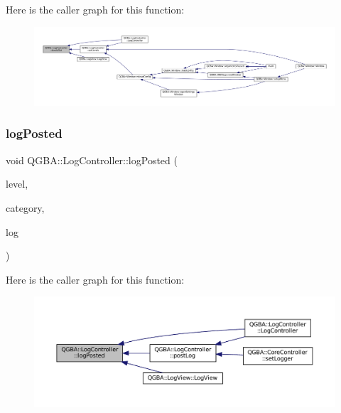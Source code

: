 Here is the caller graph for this function\+:
\nopagebreak
\begin{figure}[H]
\begin{center}
\leavevmode
\includegraphics[width=350pt]{class_q_g_b_a_1_1_log_controller_ac1dea8ca81dabf4fdf0d3910b09c9677_icgraph}
\end{center}
\end{figure}
\mbox{\label{class_q_g_b_a_1_1_log_controller_ae7c77f28b56b06f90761c3ecae19f2f0}} 
\subsubsection{\texorpdfstring{log\+Posted}{logPosted}}
{\footnotesize\ttfamily void Q\+G\+B\+A\+::\+Log\+Controller\+::log\+Posted (\begin{DoxyParamCaption}\item[{\mbox{\hyperlink{ioapi_8h_a787fa3cf048117ba7123753c1e74fcd6}{int}}}]{level,  }\item[{\mbox{\hyperlink{ioapi_8h_a787fa3cf048117ba7123753c1e74fcd6}{int}}}]{category,  }\item[{const Q\+String \&}]{log }\end{DoxyParamCaption})\hspace{0.3cm}{\ttfamily [signal]}}

Here is the caller graph for this function\+:
\nopagebreak
\begin{figure}[H]
\begin{center}
\leavevmode
\includegraphics[width=350pt]{class_q_g_b_a_1_1_log_controller_ae7c77f28b56b06f90761c3ecae19f2f0_icgraph}
\end{center}
\end{figure}
\mbox{\label{class_q_g_b_a_1_1_log_controller_ab3cdf120d225c61afba283d26414be76}} 
